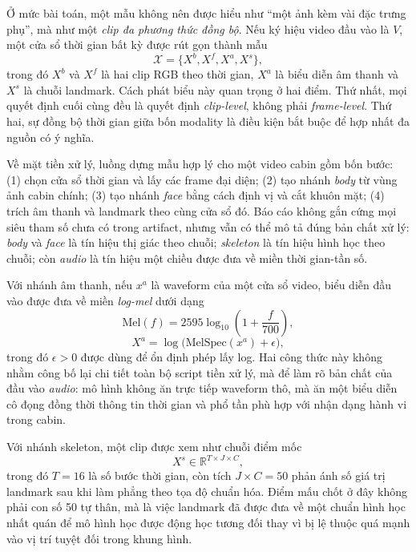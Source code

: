 \documentclass[conference,a4paper]{IEEEtran}
\begin{document}
Ở mức bài toán, một mẫu không nên được hiểu như ``một ảnh kèm vài đặc trưng phụ'', mà như một \textit{clip đa phương thức đồng bộ}. Nếu ký hiệu video đầu vào là $V$, một cửa sổ thời gian bất kỳ được rút gọn thành mẫu
\begin{equation}
\mathcal{X} = \{X^{b}, X^{f}, X^{a}, X^{s}\},
\end{equation}
trong đó $X^{b}$ và $X^{f}$ là hai clip RGB theo thời gian, $X^{a}$ là biểu diễn âm thanh và $X^{s}$ là chuỗi landmark. Cách phát biểu này quan trọng ở hai điểm. Thứ nhất, mọi quyết định cuối cùng đều là quyết định \textit{clip-level}, không phải \textit{frame-level}. Thứ hai, sự đồng bộ thời gian giữa bốn modality là điều kiện bắt buộc để hợp nhất đa nguồn có ý nghĩa.

Về mặt tiền xử lý, luồng dựng mẫu hợp lý cho một video cabin gồm bốn bước: (1) chọn cửa sổ thời gian và lấy các frame đại diện; (2) tạo nhánh \textit{body} từ vùng ảnh cabin chính; (3) tạo nhánh \textit{face} bằng cách định vị và cắt khuôn mặt; (4) trích âm thanh và landmark theo cùng cửa sổ đó. Báo cáo không gắn cứng mọi siêu tham số chưa có trong artifact, nhưng vẫn có thể mô tả đúng bản chất xử lý: \textit{body} và \textit{face} là tín hiệu thị giác theo chuỗi; \textit{skeleton} là tín hiệu hình học theo chuỗi; còn \textit{audio} là tín hiệu một chiều được đưa về miền thời gian-tần số.

Với nhánh âm thanh, nếu $x^{a}$ là waveform của một cửa sổ video, biểu diễn đầu vào được đưa về miền \textit{log-mel} dưới dạng
\begin{equation}
\mathrm{Mel}(f) = 2595 \log_{10}\left(1 + \frac{f}{700}\right),
\end{equation}
\begin{equation}
X^{a} = \log \big(\mathrm{MelSpec}(x^{a}) + \epsilon\big),
\end{equation}
trong đó $\epsilon > 0$ được dùng để ổn định phép lấy log. Hai công thức này không nhằm công bố lại chi tiết toàn bộ script tiền xử lý, mà để làm rõ bản chất của đầu vào \textit{audio}: mô hình không ăn trực tiếp waveform thô, mà ăn một biểu diễn cô đọng đồng thời thông tin thời gian và phổ tần phù hợp với nhận dạng hành vi trong cabin.

Với nhánh skeleton, một clip được xem như chuỗi điểm mốc
\begin{equation}
X^{s} \in \mathbb{R}^{T \times J \times C},
\end{equation}
trong đó $T=16$ là số bước thời gian, còn tích $J \times C = 50$ phản ánh số giá trị landmark sau khi làm phẳng theo tọa độ chuẩn hóa. Điểm mấu chốt ở đây không phải con số 50 tự thân, mà là việc landmark đã được đưa về một chuẩn hình học nhất quán để mô hình học được động học tương đối thay vì bị lệ thuộc quá mạnh vào vị trí tuyệt đối trong khung hình.
\end{document}
